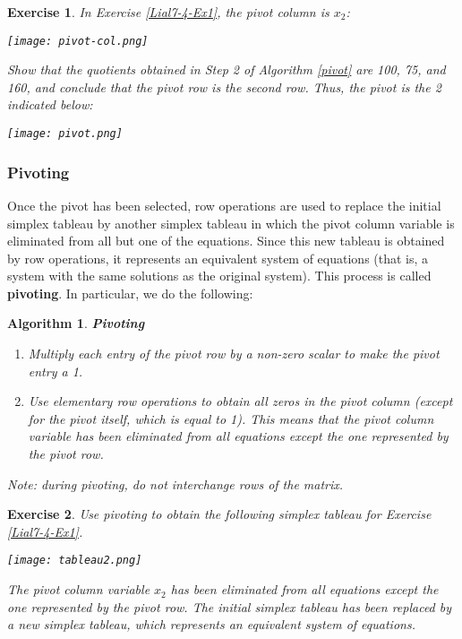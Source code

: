\documentclass[letterpaper,10pt]{article}
\newtheorem{ex}{Exercise}
\newtheorem{alg}{Algorithm}%
\begin{document}
\begin{ex}
In Exercise \ref{Lial7-4-Ex1}, the pivot column is $x_2$:
\begin{center}
\texttt{[image: pivot-col.png]}
\end{center}

Show that the quotients obtained in Step 2 of Algorithm \ref{pivot} are 100, 75, and 160, and conclude that the pivot row is the second row.  Thus, the pivot is the 2 indicated below:
\begin{center}
\texttt{[image: pivot.png]}
\end{center}
\end{ex}

\subsubsection{Pivoting}

Once the pivot has been selected, row operations are used to replace the initial simplex tableau by another simplex tableau in which the pivot column variable is eliminated from all but one of the equations. Since this new tableau is obtained by row operations, it represents an equivalent system of equations (that is, a system with the same solutions as the original system). This process is called {\bf pivoting}.  In particular, we do the following:

\begin{alg}\label{pivot2}{\bf Pivoting}
\begin{enumerate}

\item Multiply each entry of the pivot row by a non-zero scalar to make the pivot entry a 1.
\item Use elementary row operations to obtain all zeros in the pivot column (except for the pivot itself, which is equal to 1).  This means that the pivot column variable has been eliminated from all equations except the one represented by the pivot row.
\end{enumerate}
{\em Note: } during pivoting, do {\em not} interchange rows of the matrix.
\end{alg}

\begin{ex}
Use pivoting to obtain the following simplex tableau for Exercise \ref{Lial7-4-Ex1}.
\begin{center}
\texttt{[image: tableau2.png]}
\end{center}
The pivot column variable $x_2$ has been eliminated from all equations except the one represented by the pivot row. The initial simplex tableau has been replaced by a new simplex tableau, which represents an equivalent system of equations.

\end{ex}
\end{document}
